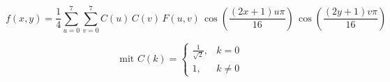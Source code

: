 \documentclass[tikz,border=6pt]{standalone}
\begin{document}
\[
f(x,y)=\frac{1}{4}
\sum_{u=0}^{7}\sum_{v=0}^{7}
C(u)\,C(v)\,F(u,v)\,
\cos\left(\frac{(2x+1)u\pi}{16}\right)\,
\cos\left(\frac{(2y+1)v\pi}{16}\right)
\]

\[
\text{mit } C(k)=
\begin{cases}
\frac{1}{\sqrt{2}}, & k=0 \\
1, & k\neq 0
\end{cases}
\]
\end{document}

